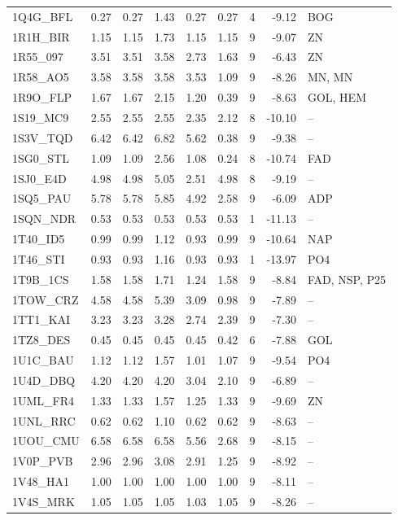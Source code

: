 \begin{longtable}{lrrrrrrrp{2.6cm}}
1Q4G\_BFL & 0.27 & 0.27 & 1.43 & 0.27 & 0.27 & 4 & -9.12 & BOG \\
1R1H\_BIR & 1.15 & 1.15 & 1.73 & 1.15 & 1.15 & 9 & -9.07 & ZN \\
1R55\_097 & 3.51 & 3.51 & 3.58 & 2.73 & 1.63 & 9 & -6.43 & ZN \\
1R58\_AO5 & 3.58 & 3.58 & 3.58 & 3.53 & 1.09 & 9 & -8.26 & MN, MN \\
1R9O\_FLP & 1.67 & 1.67 & 2.15 & 1.20 & 0.39 & 9 & -8.63 & GOL, HEM \\
1S19\_MC9 & 2.55 & 2.55 & 2.55 & 2.35 & 2.12 & 8 & -10.10 & -- \\
1S3V\_TQD & 6.42 & 6.42 & 6.82 & 5.62 & 0.38 & 9 & -9.38 & -- \\
1SG0\_STL & 1.09 & 1.09 & 2.56 & 1.08 & 0.24 & 8 & -10.74 & FAD \\
1SJ0\_E4D & 4.98 & 4.98 & 5.05 & 2.51 & 4.98 & 8 & -9.19 & -- \\
1SQ5\_PAU & 5.78 & 5.78 & 5.85 & 4.92 & 2.58 & 9 & -6.09 & ADP \\
1SQN\_NDR & 0.53 & 0.53 & 0.53 & 0.53 & 0.53 & 1 & -11.13 & -- \\
1T40\_ID5 & 0.99 & 0.99 & 1.12 & 0.93 & 0.99 & 9 & -10.64 & NAP \\
1T46\_STI & 0.93 & 0.93 & 1.16 & 0.93 & 0.93 & 1 & -13.97 & PO4 \\
1T9B\_1CS & 1.58 & 1.58 & 1.71 & 1.24 & 1.58 & 9 & -8.84 & FAD, NSP, P25 \\
1TOW\_CRZ & 4.58 & 4.58 & 5.39 & 3.09 & 0.98 & 9 & -7.89 & -- \\
1TT1\_KAI & 3.23 & 3.23 & 3.28 & 2.74 & 2.39 & 9 & -7.30 & -- \\
1TZ8\_DES & 0.45 & 0.45 & 0.45 & 0.45 & 0.42 & 6 & -7.88 & GOL \\
1U1C\_BAU & 1.12 & 1.12 & 1.57 & 1.01 & 1.07 & 9 & -9.54 & PO4 \\
1U4D\_DBQ & 4.20 & 4.20 & 4.20 & 3.04 & 2.10 & 9 & -6.89 & -- \\
1UML\_FR4 & 1.33 & 1.33 & 1.57 & 1.25 & 1.33 & 9 & -9.69 & ZN \\
1UNL\_RRC & 0.62 & 0.62 & 1.10 & 0.62 & 0.62 & 9 & -8.63 & -- \\
1UOU\_CMU & 6.58 & 6.58 & 6.58 & 5.56 & 2.68 & 9 & -8.15 & -- \\
1V0P\_PVB & 2.96 & 2.96 & 3.08 & 2.91 & 1.25 & 9 & -8.92 & -- \\
1V48\_HA1 & 1.00 & 1.00 & 1.00 & 1.00 & 1.00 & 9 & -8.11 & -- \\
1V4S\_MRK & 1.05 & 1.05 & 1.05 & 1.03 & 1.05 & 9 & -8.26 & -- \\

\end{longtable}
